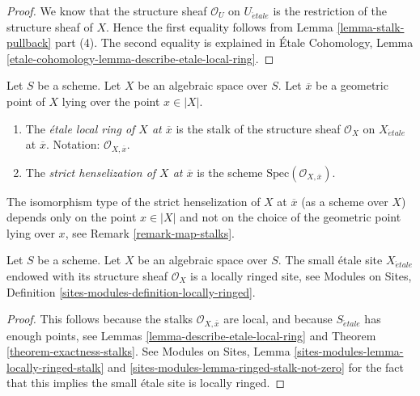 \begin{proof}
We know that the structure sheaf $\mathcal{O}_U$ on
$U_{\acute{e}tale}$ is the restriction of the structure sheaf of $X$.
Hence the first equality follows from
Lemma \ref{lemma-stalk-pullback} part (4).
The second equality is explained in
\'Etale Cohomology,
Lemma \ref{etale-cohomology-lemma-describe-etale-local-ring}.
\end{proof}

\begin{definition}
\label{definition-etale-local-rings}
Let $S$ be a scheme.
Let $X$ be an algebraic space over $S$.
Let $\overline{x}$ be a geometric point of $X$ lying over the point
$x \in |X|$.
\begin{enumerate}
\item The {\it \'etale local ring of $X$ at $\overline{x}$}
is the stalk of the structure sheaf $\mathcal{O}_X$ on $X_{\acute{e}tale}$
at $\overline{x}$.
Notation: $\mathcal{O}_{X, \overline{x}}$.
\item The {\it strict henselization of $X$ at $\overline{x}$}
is the scheme $\text{Spec}(\mathcal{O}_{X, \overline{x}})$.
\end{enumerate}
\end{definition}

\noindent
The isomorphism type of the strict henselization of $X$ at $\overline{x}$
(as a scheme over $X$) depends only on the point $x \in |X|$ and not on
the choice of the geometric point lying over $x$, see
Remark \ref{remark-map-stalks}.

\begin{lemma}
\label{lemma-etale-site-locally-ringed}
Let $S$ be a scheme.
Let $X$ be an algebraic space over $S$.
The small \'etale site $X_{\acute{e}tale}$ endowed with its
structure sheaf $\mathcal{O}_X$ is a locally ringed site, see
Modules on Sites, Definition \ref{sites-modules-definition-locally-ringed}.
\end{lemma}

\begin{proof}
This follows because the stalks
$\mathcal{O}_{X, \overline{x}}$ are
local, and because $S_{\acute{e}tale}$ has enough points, see
Lemmas \ref{lemma-describe-etale-local-ring} and
Theorem \ref{theorem-exactness-stalks}.
See
Modules on Sites, Lemma \ref{sites-modules-lemma-locally-ringed-stalk} and
\ref{sites-modules-lemma-ringed-stalk-not-zero}
for the fact that this implies the small \'etale site is locally ringed.
\end{proof}




